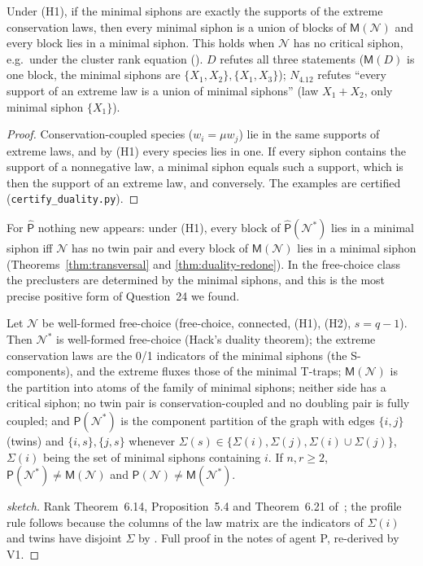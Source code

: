 \documentclass[11pt,a4paper]{report}
\newcommand{\Net}{\mathcal{N}}
\newcommand{\Nd}{\mathcal{N}^{*}}
\newcommand{\Pre}{\mathsf{P}}
\newcommand{\Ph}{\widehat{\mathsf{P}}}
\newcommand{\Mips}{\mathsf{M}}
\begin{document}
\begin{proposition}\label{prop:G}
Under (H1), if the minimal siphons are exactly the supports of the extreme conservation laws, then every minimal
siphon is a union of blocks of \(\Mips(\Net)\) and every block lies in a minimal siphon. This holds when \(\Net\) has
no critical siphon, e.g.\ under the cluster rank equation (). \(D\) refutes all three statements
(\(\Mips(D)\) is one block, the minimal siphons are \(\{X_1,X_2\},\{X_1,X_3\}\)); \(N_{4.12}\) refutes ``every support of an
extreme law is a union of minimal siphons'' (law \(X_1+X_2\), only minimal siphon \(\{X_1\}\)).
\end{proposition}
\begin{proof}
Conservation-coupled species (\(w_i=\mu w_j\)) lie in the same supports of extreme laws, and by (H1) every species lies
in one. If every siphon contains the support of a nonnegative law, a minimal siphon equals such a support, which is
then the support of an extreme law, and conversely. The examples are certified (\texttt{certify\_duality.py}).
\end{proof}

For \(\Ph\) nothing new appears: under (H1), every block of \(\Ph(\Nd)\) lies in a minimal siphon iff \(\Net\) has no
twin pair and every block of \(\Mips(\Net)\) lies in a minimal siphon (Theorems~\ref{thm:transversal} and
\ref{thm:duality-redone}). In the free-choice class the preclusters are determined by the minimal siphons, and this
is the most precise positive form of Question~24 we found.

\begin{theorem}\label{thm:WFFC}
Let \(\Net\) be well-formed free-choice (free-choice, connected, (H1), (H2), \(s=q-1\)). Then \(\Nd\) is well-formed
free-choice (Hack's duality theorem); the extreme conservation laws are the 0/1 indicators of the minimal siphons
(the S-components), and the extreme fluxes those of the minimal T-traps; \(\Mips(\Net)\) is the partition into atoms
of the family of minimal siphons; neither side has a critical siphon; no twin pair is conservation-coupled and no
doubling pair is fully coupled; and \(\Pre(\Nd)\) is the component partition of the graph with edges \(\{i,j\}\)
(twins) and \(\{i,s\},\{j,s\}\) whenever \(\Sigma(s)\in\{\Sigma(i),\Sigma(j),\Sigma(i)\cup\Sigma(j)\}\), \(\Sigma(i)\)
being the set of minimal siphons containing \(i\). If \(n,r\ge2\), \(\Pre(\Nd)\neq\Mips(\Net)\) and
\(\Pre(\Net)\neq\Mips(\Nd)\).
\end{theorem}
\begin{proof}[sketch]
Rank Theorem~6.14, Proposition~5.4 and Theorem~6.21 of~\autocite{DeselEsparza1995}; the profile rule follows
because the columns of the law matrix are the indicators of \(\Sigma(i)\) and twins have disjoint \(\Sigma\) by
. Full proof in the notes of agent P, re-derived by V1.
\end{proof}
\end{document}
